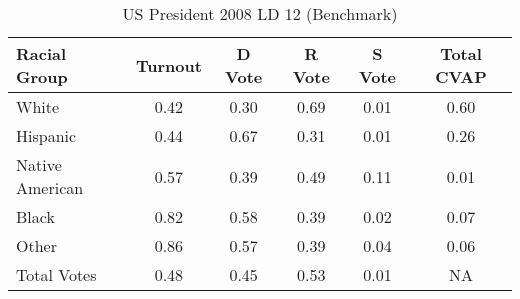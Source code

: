 \begin{table}[htb]
\begin{center}
\caption{US President 2008 LD 12 (Benchmark)}
\label{pres08_cvap_ld_12_benchmark}
\begin{tabular}{lccccc}
  \hline
Racial Group & Turnout & D Vote & R Vote & S Vote & Total CVAP \\ 
  \hline
White & 0.42  & 0.30  & 0.69  & 0.01  & 0.60 \\
    Hispanic & 0.44  & 0.67  & 0.31  & 0.01  & 0.26 \\
    Native American & 0.57  & 0.39  & 0.49  & 0.11  & 0.01 \\
    Black & 0.82  & 0.58  & 0.39  & 0.02  & 0.07 \\
    Other & 0.86  & 0.57  & 0.39  & 0.04  & 0.06 \\
    Total Votes & 0.48  & 0.45  & 0.53  & 0.01  &  NA \\
   \hline
\end{tabular}
\end{center}
\end{table}
